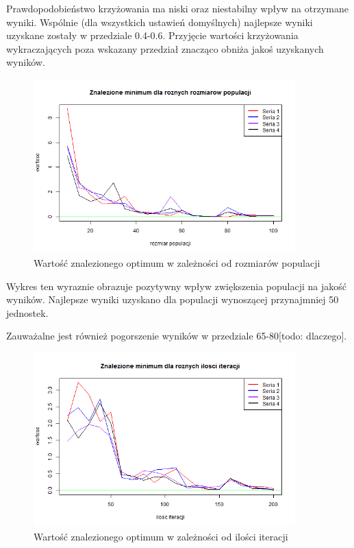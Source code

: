 \documentclass[11pt, a4paper]{article}
\newcommand{\fbi}{\leavevmode{\parindent=1em\indent}}
\begin{document}
\fbi
Prawdopodobieństwo krzyżowania ma niski oraz niestabilny wpływ na otrzymane wyniki. Wspólnie (dla wszystkich ustawień domyślnych) najlepsze wyniki uzyskane zostały w przedziale 0.4-0.6. Przyjęcie wartości krzyżowania wykraczających poza wskazany przedział znacząco obniża jakoś uzyskanych wyników.


\begin{figure}[H]
	\begin{center}
		\includegraphics[width=0.9\textwidth]{./assets/Gulf4.png} %
		\caption{Wartość znalezionego optimum w zależności od rozmiarów populacji}
		\label{fig:gulf4}
	\end{center}
\end{figure}

\fbi
Wykres ten wyraznie obrazuje pozytywny wpływ zwiększenia populacji na jakość wyników. Najlepsze wyniki uzyskano dla populacji wynoszącej przynajmniej 50 jednostek.

\fbi
Zauważalne jest również pogorszenie wyników w przedziale 65-80[todo: dlaczego].

\begin{figure}[H]
	\begin{center}
		\includegraphics[width=0.9\textwidth]{./assets/Gulf5.png} %
		\caption{Wartość znalezionego optimum w zależności od ilości iteracji}
		\label{fig:gulf5}
	\end{center}
\end{figure}
\end{document}
